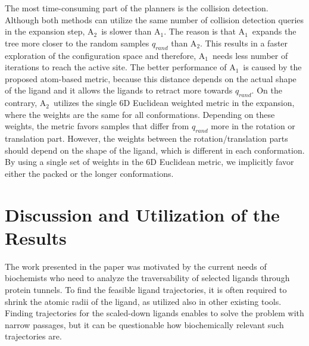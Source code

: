 \documentclass[usletter, 10pt, conference]{ieeeconf} %
\def\qrand{q_{rand}}
\def\RA{A$_{1}$}
\def\RB{A$_{2}$}
\begin{document}
The most time-consuming part of the planners is the collision detection. 
Although both methods can utilize the same number of collision detection queries in the expansion step, \RB\ is slower than \RA.
The reason is that \RA\ expands the tree more closer to the random samples $\qrand$ than \RB.
This results in a faster exploration of the configuration space and therefore, \RA\ needs less number of iterations to reach the active site.
The better performance of \RA\ is caused by the proposed atom-based metric, because this distance depends on the actual shape of the ligand and 
it allows the ligands to retract more towards $\qrand$.
On the contrary, \RB\ utilizes the single 6D Euclidean weighted metric in the expansion, where the weights are the same for all conformations.
Depending on these weights, the metric favors samples that differ from $\qrand$ more in the rotation or translation part.
However, the weights between the rotation/translation parts should depend on the shape of the ligand, which is different in each conformation.
By using a single set of weights in the 6D Euclidean metric, we implicitly favor either the packed or the longer conformations.


\section{Discussion and Utilization of the Results}

The work presented in the paper was motivated by the current needs of biochemists who need to analyze the traversability of selected ligands through protein tunnels.
To find the feasible ligand trajectories, it is often required to shrink the atomic radii of the ligand, as utilized also in other existing tools.
Finding trajectories for the scaled-down ligands enables to solve the problem with narrow passages, but it can be questionable how biochemically relevant such trajectories are.
\end{document}
